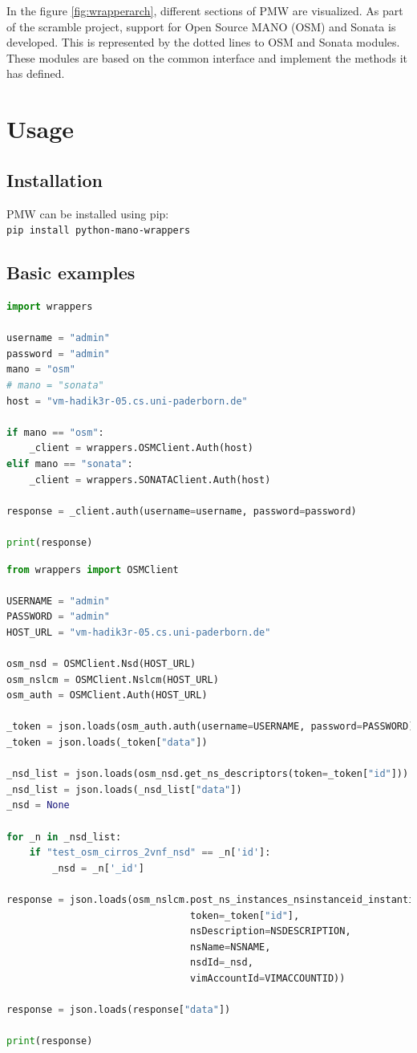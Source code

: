 In the figure \ref{fig:wrapperarch}, different sections of PMW are visualized. As part of the scramble project, support for Open Source MANO (OSM) and Sonata is developed. This is represented by the dotted lines to OSM and Sonata modules. These modules are based on the common interface and implement the methods it has defined.  

\section{Usage}

\subsection{Installation}

PMW can be installed using pip:\\


\texttt{pip install python-mano-wrappers} 

\subsection{Basic examples}

\begin{lstlisting}[language=python,caption=Fetching Auth token]
import wrappers

username = "admin"
password = "admin"
mano = "osm"
# mano = "sonata"
host = "vm-hadik3r-05.cs.uni-paderborn.de"

if mano == "osm":
	_client = wrappers.OSMClient.Auth(host)
elif mano == "sonata":
	_client = wrappers.SONATAClient.Auth(host)

response = _client.auth(username=username, password=password)

print(response)
\end{lstlisting}

\begin{lstlisting}[language=python,caption=Instantiating a NS in OSM]
from wrappers import OSMClient

USERNAME = "admin"
PASSWORD = "admin"
HOST_URL = "vm-hadik3r-05.cs.uni-paderborn.de"

osm_nsd = OSMClient.Nsd(HOST_URL)
osm_nslcm = OSMClient.Nslcm(HOST_URL) 
osm_auth = OSMClient.Auth(HOST_URL)

_token = json.loads(osm_auth.auth(username=USERNAME, password=PASSWORD))
_token = json.loads(_token["data"])

_nsd_list = json.loads(osm_nsd.get_ns_descriptors(token=_token["id"]))
_nsd_list = json.loads(_nsd_list["data"])
_nsd = None

for _n in _nsd_list:
	if "test_osm_cirros_2vnf_nsd" == _n['id']:            
		_nsd = _n['_id']

response = json.loads(osm_nslcm.post_ns_instances_nsinstanceid_instantiate(
								token=_token["id"],
								nsDescription=NSDESCRIPTION, 
								nsName=NSNAME, 
								nsdId=_nsd, 
								vimAccountId=VIMACCOUNTID))

response = json.loads(response["data"])

print(response)
\end{lstlisting}

